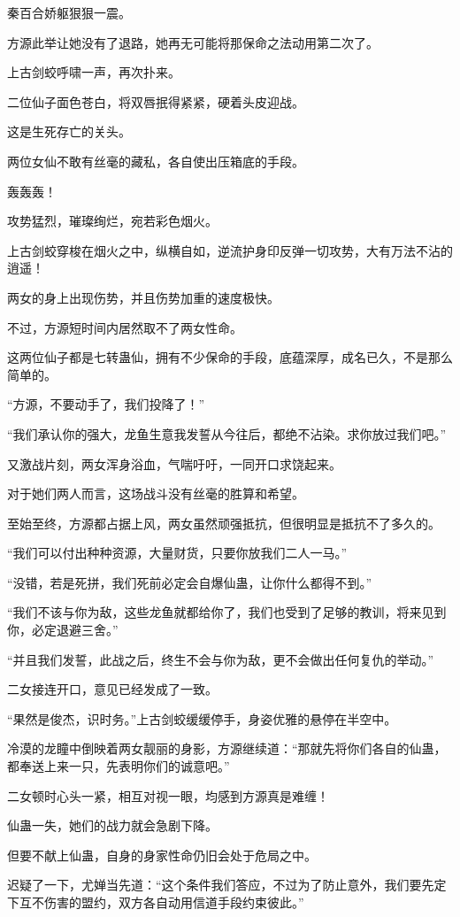 \begin{this_body}
秦百合娇躯狠狠一震。

方源此举让她没有了退路，她再无可能将那保命之法动用第二次了。

上古剑蛟呼啸一声，再次扑来。

二位仙子面色苍白，将双唇抿得紧紧，硬着头皮迎战。

这是生死存亡的关头。

两位女仙不敢有丝毫的藏私，各自使出压箱底的手段。

轰轰轰！

攻势猛烈，璀璨绚烂，宛若彩色烟火。

上古剑蛟穿梭在烟火之中，纵横自如，逆流护身印反弹一切攻势，大有万法不沾的逍遥！

两女的身上出现伤势，并且伤势加重的速度极快。

不过，方源短时间内居然取不了两女性命。

这两位仙子都是七转蛊仙，拥有不少保命的手段，底蕴深厚，成名已久，不是那么简单的。

“方源，不要动手了，我们投降了！”

“我们承认你的强大，龙鱼生意我发誓从今往后，都绝不沾染。求你放过我们吧。”

又激战片刻，两女浑身浴血，气喘吁吁，一同开口求饶起来。

对于她们两人而言，这场战斗没有丝毫的胜算和希望。

至始至终，方源都占据上风，两女虽然顽强抵抗，但很明显是抵抗不了多久的。

“我们可以付出种种资源，大量财货，只要你放我们二人一马。”

“没错，若是死拼，我们死前必定会自爆仙蛊，让你什么都得不到。”

“我们不该与你为敌，这些龙鱼就都给你了，我们也受到了足够的教训，将来见到你，必定退避三舍。”

“并且我们发誓，此战之后，终生不会与你为敌，更不会做出任何复仇的举动。”

二女接连开口，意见已经发成了一致。

“果然是俊杰，识时务。”上古剑蛟缓缓停手，身姿优雅的悬停在半空中。

冷漠的龙瞳中倒映着两女靓丽的身影，方源继续道：“那就先将你们各自的仙蛊，都奉送上来一只，先表明你们的诚意吧。”

二女顿时心头一紧，相互对视一眼，均感到方源真是难缠！

仙蛊一失，她们的战力就会急剧下降。

但要不献上仙蛊，自身的身家性命仍旧会处于危局之中。

迟疑了一下，尤婵当先道：“这个条件我们答应，不过为了防止意外，我们要先定下互不伤害的盟约，双方各自动用信道手段约束彼此。”


\end{this_body}
